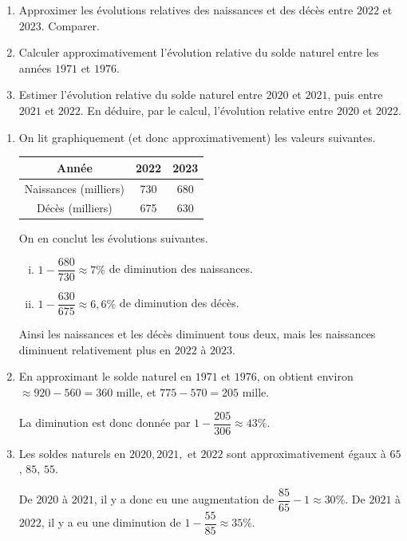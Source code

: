 \documentclass[a4paper, 14pt]{extarticle}
\theoremstyle{plain}
\theoremstyle{definition}
\begin{document}
{\begin{enumerate}
		\item Approximer les évolutions relatives des naissances et des décès entre $2022$ et $2023$. Comparer.
		
		\item Calculer approximativement l'évolution relative du solde naturel entre les années $1971$ et $1976$.
		
		\item Estimer l'évolution relative du solde naturel entre $2020$ et $2021$, puis entre $2021$ et $2022$.
		En déduire, par le calcul, l'évolution relative entre $2020$ et $2022$.

	\end{enumerate}
}{
	\begin{enumerate}
		\item 
		On lit graphiquement (et donc approximativement) les valeurs suivantes.
		
		\begin{tabular}{|c|c|c|}\hline
			Année & 2022 & 2023 \\ \hline
			Naissances (milliers) & 730 & 680 \\ \hline
			Décès (milliers) & 675 & 630 \\ \hline
		\end{tabular}

		On en conclut les évolutions suivantes.
		\begin{enumerate}[i)]
			\item $1-\dfrac{680}{730} \approx 7\%$ de diminution des naissances.
			\item $1- \dfrac{630}{675} \approx 6,6\%$ de diminution des décès.
		\end{enumerate}
		
		Ainsi les naissances et les décès diminuent tous deux, mais les naissances diminuent relativement plus en $2022$ à $2023$.
		
		\item 
		En approximant le solde naturel en $1971$ et $1976$, on obtient environ $ \approx 920 - 560 = 360$ mille, et $775 - 570 = 205$ mille.
		
		La diminution est donc donnée par $1-\dfrac{205}{306} \approx 43\%$.
		
		\item 
		Les soldes naturels en $2020, 2021,$ et $2022$ sont approximativement égaux à $65$, $85$, $55$.
		
		De $2020$ à $2021$, il y a donc eu une augmentation de $\dfrac{85}{65}- 1 \approx 30\%$.
		De $2021$ à $2022$, il y a eu une diminution de $1-\dfrac{55}{85} \approx 35\%$.
		

\end{enumerate}}
\end{document}
